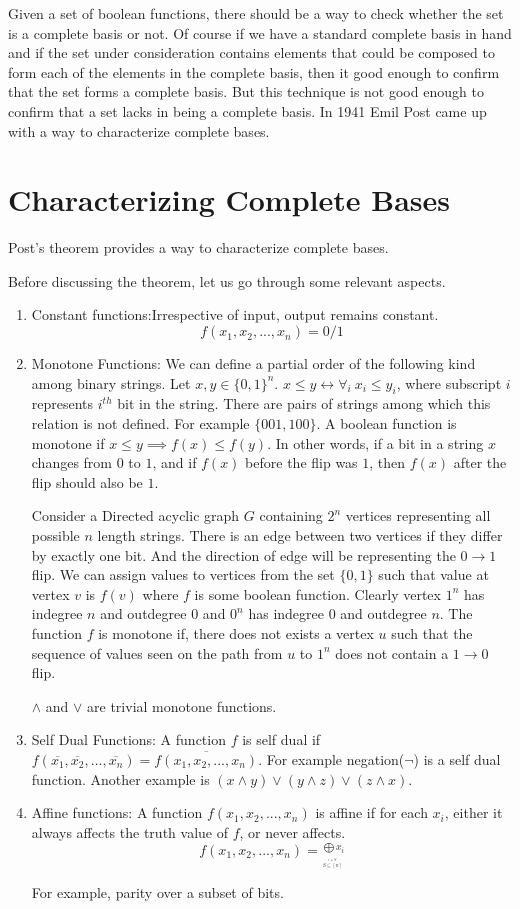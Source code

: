 Given a set of boolean functions, there should be a way to check whether the set is a complete basis or not. Of course if we have a standard complete basis in hand and if the set under consideration contains elements that could be composed to form each of the elements in the complete basis, then it good enough to confirm that the set forms a complete basis. But this technique is not good enough to confirm that a set lacks in being a complete basis. In 1941 Emil Post came up with a way to characterize complete bases.

\section {Characterizing Complete Bases}
Post's theorem provides a way to characterize complete bases.

Before discussing the theorem, let us go through some relevant aspects. 
\begin{enumerate}
\item{Constant functions:Irrespective of input, output remains constant.
\[
f(x_1,x_2,...,x_n) = 0/1
\]
}
\item{Monotone Functions: We can define a partial order of the following kind among binary strings. Let $x,y \in \{0,1\}^n$. $x \leq y \leftrightarrow \forall _i  \  x_i \leq y_i$, where subscript $i$ represents $i^{th}$ bit in the string. There are pairs of strings among which this relation is not defined. For example $\{001,100\}$. A boolean function is monotone if $x \leq y \implies f(x) \leq f(y)$. In other words, if a bit in a string $x$ changes from $0$ to $1$, and if $f(x)$ before the flip was $1$, then $f(x)$ after the flip should also be $1$.

Consider a Directed acyclic graph $G$ containing $2^n$ vertices representing all possible $n$ length strings. There is an edge between two vertices if they differ by exactly one bit. And the direction of edge will be representing the $0 \rightarrow 1$ flip. We can assign values to vertices from the set $\{0,1\}$ such that value at vertex $v$ is $f(v)$ where $f$ is some boolean function. Clearly vertex $1^n$ has indegree $n$ and outdegree $0$ and $0^n$ has indegree $0$ and outdegree $n$. The function $f$ is monotone if, there does not exists a vertex $u$ such that the sequence of values seen on the path from $u$ to $1^n$ does not contain a $1 \rightarrow 0$ flip.

$\wedge$ and $\vee$ are trivial monotone functions. 
}

\item{Self Dual Functions: A function $f$ is self dual if $f(\overline{x_1},\overline{x_2},...,\overline{x_n})=\overline{f(x_1,x_2,...,x_n)}$. For example negation($\neg$) is a self dual function. Another example is $(x \wedge y) \vee (y \wedge z) \vee (z \wedge x)$.
}
\item{Affine functions: A function $f(x_1,x_2,...,x_n)$ is affine if for each $x_i$, either it always affects the truth value of $f$, or never affects.
\[
f(x_1,x_2,...,x_n)= \stackrel{\bigoplus x_i}{_{_{_{\stackrel{i \in S}{S \subseteq [n]}}}}}  
\]

For example, parity over a subset of bits.
}
\end{enumerate}


